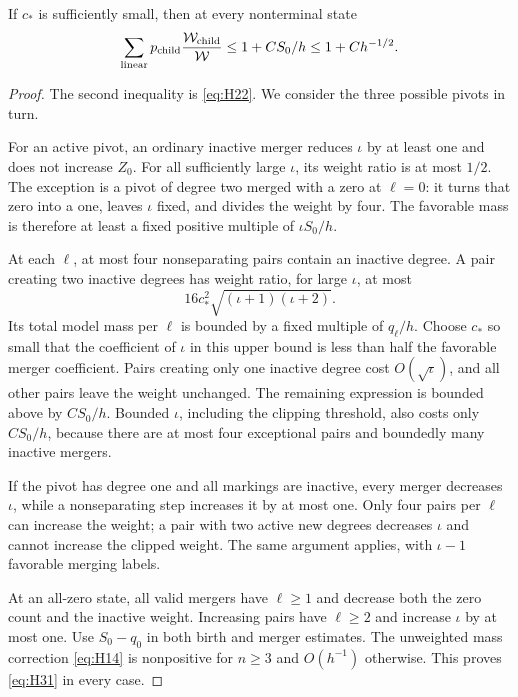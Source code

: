 \begin{lemma}\label{lem:weighted-linear}
If \(c_*\) is sufficiently small, then at every nonterminal state
\begin{equation}
\sum_{\rm linear}p_{\rm child}
\frac{\mathcal W_{\rm child}}{\mathcal W}
\le1+CS_0/h\le1+Ch^{-1/2}.
\label{eq:H31}
\end{equation}
\end{lemma}

\begin{proof}
The second inequality is \eqref{eq:H22}. We consider the three possible
pivots in turn.

For an active pivot, an ordinary inactive merger reduces \(\iota\) by at
least one and does not increase \(Z_0\). For all sufficiently large
\(\iota\), its weight ratio is at most \(1/2\). The exception is a pivot of degree two
merged with a zero at \(\ell=0\): it turns that zero into a one, leaves
\(\iota\) fixed, and divides the weight by four. The favorable mass is
therefore at least a fixed positive multiple of \(\iota S_0/h\).

At each \(\ell\), at most four nonseparating pairs contain an inactive
degree. A pair creating two inactive degrees has weight ratio, for large
\(\iota\), at most \[
16c_*^2\sqrt{(\iota+1)(\iota+2)}.
\] Its total model mass per \(\ell\) is bounded by a fixed multiple of
\(q_\ell/h\). Choose \(c_*\) so small that the coefficient of \(\iota\) in
this upper bound is less than half the favorable merger coefficient.
Pairs creating only one inactive degree cost \(O(\sqrt \iota)\), and all
other pairs leave the weight unchanged. The remaining expression is
bounded above by \(CS_0/h\). Bounded \(\iota\), including the clipping
threshold, also costs only \(CS_0/h\), because there are at most four
exceptional pairs and boundedly many inactive mergers.

If the pivot has degree one and all markings are inactive, every merger
decreases \(\iota\), while a nonseparating step increases it by at most one.
Only four pairs per \(\ell\) can increase the weight; a pair with two
active new degrees decreases \(\iota\) and cannot increase the clipped
weight. The same argument applies, with \(\iota-1\) favorable merging
labels.

At an all-zero state, all valid mergers have \(\ell\ge1\) and decrease
both the zero count and the inactive weight. Increasing pairs have
\(\ell\ge2\) and increase \(\iota\) by at most one. Use \(S_0-q_0\) in both
birth and merger estimates. The unweighted mass correction \eqref{eq:H14} is
nonpositive for \(n\ge3\) and \(O(h^{-1})\) otherwise. This proves \eqref{eq:H31}
in every case.
\end{proof}


